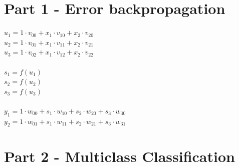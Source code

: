 \documentclass[a4paper]{article}    %
\begin{document}
\bigskip

\section{Part 1 - Error backpropagation}

$ u_1 = 1 \cdot v_{00} + x_1 \cdot v_{10} + x_2 \cdot v_{20} $\\
$ u_2 = 1 \cdot v_{01} + x_1 \cdot v_{11} + x_2 \cdot v_{21} $\\
$ u_3 = 1 \cdot v_{02} + x_1 \cdot v_{12} + x_2 \cdot v_{22} $\\
\vspace{0.1mm}\\
$ s_1 = f(u_1) $\\
$ s_2 = f(u_2) $\\
$ s_3 = f(u_3) $\\
\vspace{0.1mm}\\
$ y_1 = 1 \cdot w_{00} + s_1 \cdot w_{10} + s_2 \cdot w_{20} + s_3 \cdot w_{30} $\\
$ y_2 = 1 \cdot w_{01} + s_1 \cdot w_{11} + s_2 \cdot w_{21} + s_3 \cdot w_{31} $



\section{Part 2 - Multiclass Classification}

\end{document}
